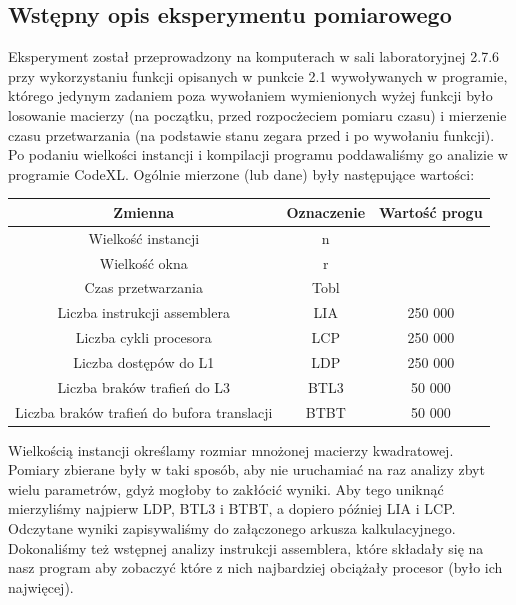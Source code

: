 \documentclass[10pt,a4paper]{article}
\begin{document}
\subsection{Wstępny opis eksperymentu pomiarowego}
Eksperyment został przeprowadzony na komputerach w sali laboratoryjnej 2.7.6 przy
wykorzystaniu funkcji opisanych w punkcie 2.1 wywoływanych w programie, którego jedynym
zadaniem poza wywołaniem wymienionych wyżej funkcji było losowanie macierzy
(na początku, przed rozpocżeciem pomiaru czasu) i mierzenie czasu przetwarzania
(na podstawie stanu zegara przed i po wywołaniu funkcji). Po podaniu wielkości instancji
i kompilacji programu poddawaliśmy go analizie w programie CodeXL. Ogólnie mierzone (lub dane)
były następujące wartości:
\begin{center}
	\begin{tabular}{ |c|c|c| }
		\hline
		Zmienna                                      & Oznaczenie & Wartość progu \\
		\hline
		Wielkość instancji                         & n          &                 \\
		Wielkość okna                              & r          &                 \\
		Czas przetwarzania                           & Tobl       &                 \\
		Liczba instrukcji assemblera                 & LIA        & 250 000         \\
		Liczba cykli procesora                       & LCP        & 250 000         \\
		Liczba dostępów do L1                      & LDP        & 250 000         \\
		Liczba braków trafień do L3                & BTL3       & 50 000          \\
		Liczba braków trafień do bufora translacji & BTBT       & 50 000          \\
		\hline
	\end{tabular}
\end{center}
Wielkością instancji określamy rozmiar mnożonej macierzy kwadratowej.\\
Pomiary zbierane były w taki sposób, aby nie uruchamiać na raz analizy zbyt wielu
parametrów, gdyż mogłoby to zakłócić wyniki. Aby tego uniknąć mierzyliśmy najpierw 
LDP, BTL3 i BTBT, a dopiero później LIA i LCP. Odczytane wyniki zapisywaliśmy do 
załączonego arkusza kalkulacyjnego. Dokonaliśmy też wstępnej analizy instrukcji
assemblera, które składały się na nasz program aby zobaczyć które z nich najbardziej
obciążały procesor (było ich najwięcej).
\end{document}
